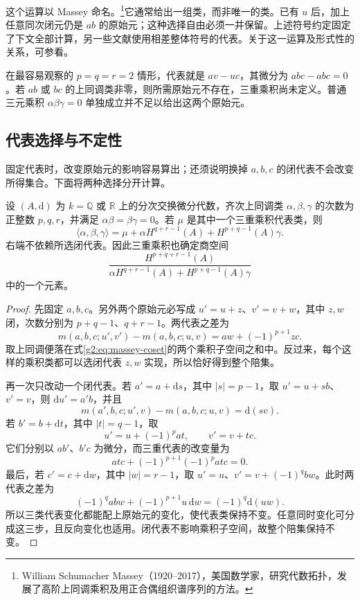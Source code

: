 这个运算以 Massey 命名。\footnote{William Schumacher Massey（1920--2017），美国数学家，研究代数拓扑，发展了高阶上同调乘积及用正合偶组织谱序列的方法。}它通常给出一组类，而非唯一的类。已有 \(u\) 后，加上任意同次闭元仍是 \(ab\) 的原始元；这种选择自由必须一并保留。上述符号约定固定了下文全部计算，另一些文献使用相差整体符号的代表。关于这一运算及形式性的关系，可参看\cite[第4节，第260—262页]{DeligneGriffithsMorganSullivan1975}。

\ProseParagraphBreak

在最容易观察的 \(p=q=r=2\) 情形，代表就是 \(av-uc\)，其微分为 \(abc-abc=0\)。若 \(ab\) 或 \(bc\) 的上同调类非零，则所需原始元不存在，三重乘积尚未定义。普通三元乘积 \(\alpha\beta\gamma=0\) 单独成立并不足以给出这两个原始元。

\subsection{代表选择与不定性}
\label{g2:subsec:E04:02}

固定代表时，改变原始元的影响容易算出；还须说明换掉 \(a,b,c\) 的闭代表不会改变所得集合。下面将两种选择分开计算。

\begin{proposition}\label{g2:prop:massey-indeterminacy}
	设 \((A,\mathrm d)\) 为 \(k=\mathbb Q\) 或 \(\mathbb R\) 上的分次交换微分代数，齐次上同调类 \(\alpha,\beta,\gamma\) 的次数为正整数 \(p,q,r\)，并满足 \(\alpha\beta=\beta\gamma=0\)。若 \(\mu\) 是其中一个三重乘积代表类，则
	\begin{equation}\label{g2:eq:massey-coset}
		\langle\alpha,\beta,\gamma\rangle
		=\mu+\alpha H^{q+r-1}(A)+H^{p+q-1}(A)\gamma.
	\end{equation}
	右端不依赖所选闭代表。因此三重乘积也确定商空间
	\[
		\frac{H^{p+q+r-1}(A)}{\alpha H^{q+r-1}(A)+H^{p+q-1}(A)\gamma}
	\]
	中的一个元素。
\end{proposition}
\begin{proof}
	先固定 \(a,b,c\)。另外两个原始元必写成 \(u'=u+z\)、\(v'=v+w\)，其中 \(z,w\) 闭，次数分别为 \(p+q-1\)、\(q+r-1\)。两代表之差为
	\[
		m(a,b,c;u',v')-m(a,b,c;u,v)=aw+(-1)^{p+1}zc.
	\]
	取上同调便落在式\eqref{g2:eq:massey-coset}的两个乘积子空间之和中。反过来，每个这样的乘积类都可以选闭代表 \(z,w\) 实现，所以恰好得到整个陪集。

	再一次只改动一个闭代表。若 \(a'=a+\mathrm ds\)，其中 \(|s|=p-1\)，取 \(u'=u+sb\)、\(v'=v\)，则 \(\mathrm du'=a'b\)，并且
	\[
		m(a',b,c;u',v)-m(a,b,c;u,v)=\mathrm d(sv).
	\]
	若 \(b'=b+\mathrm dt\)，其中 \(|t|=q-1\)，取
	\[
		u'=u+(-1)^pat,\qquad v'=v+tc.
	\]
	它们分别以 \(ab'\)、\(b'c\) 为微分，而三重代表的改变量为
	\[
		atc+(-1)^{p+1}(-1)^patc=0.
	\]
	最后，若 \(c'=c+\mathrm dw\)，其中 \(|w|=r-1\)，取 \(u'=u\)、\(v'=v+(-1)^qbw\)。此时两代表之差为
	\[
		(-1)^qabw+(-1)^{p+1}u\,\mathrm dw=(-1)^q\mathrm d(uw).
	\]
	所以三类代表变化都能配上原始元的变化，使代表类保持不变。任意同时变化可分成这三步，且反向变化也适用。闭代表不影响乘积子空间，故整个陪集保持不变。
\end{proof}

